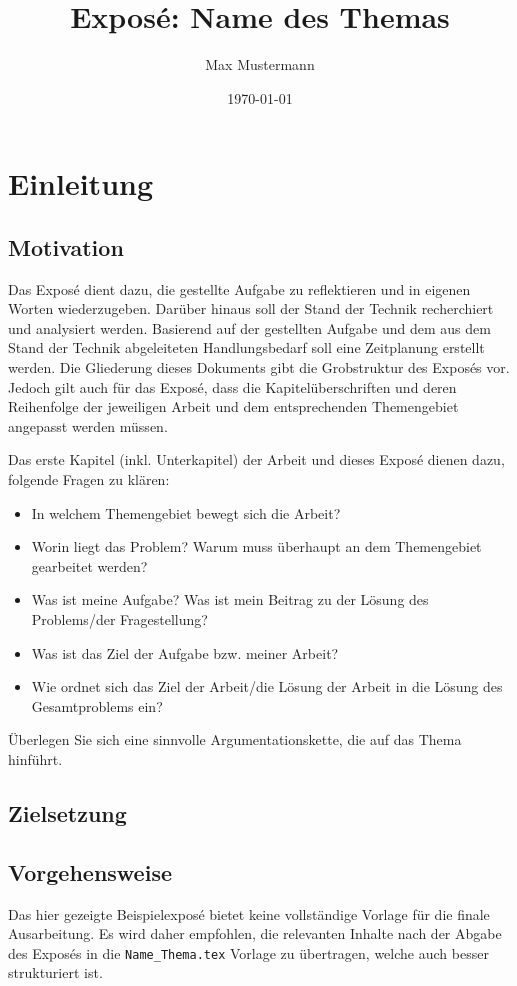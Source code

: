 \documentclass[ a4paper,
                toc=bibliography
              ]{scrartcl}
\author{Max Mustermann}
\title{Exposé: Name des Themas}
\date{\today}
\begin{document}
\maketitle
	
\section{Einleitung}
\subsection{Motivation}

Das Exposé dient dazu, die gestellte Aufgabe zu reflektieren und in eigenen Worten wiederzugeben. Darüber hinaus soll der Stand der Technik recherchiert und analysiert werden. Basierend auf der gestellten Aufgabe und dem aus dem Stand der Technik abgeleiteten Handlungsbedarf soll eine Zeitplanung erstellt werden. Die Gliederung dieses Dokuments gibt die Grobstruktur des Exposés vor. Jedoch gilt auch für das Exposé, dass die Kapitelüberschriften und deren Reihenfolge der jeweiligen Arbeit und dem entsprechenden Themengebiet angepasst werden müssen.

Das erste Kapitel (inkl. Unterkapitel) der Arbeit und dieses Exposé dienen dazu, folgende Fragen zu klären:

\begin{itemize}
    \item In welchem Themengebiet bewegt sich die Arbeit?
    \item Worin liegt das Problem? Warum muss überhaupt an dem Themengebiet gearbeitet werden?
    \item Was ist meine Aufgabe? Was ist mein Beitrag zu der Lösung des Problems/der Fragestellung?
    \item Was ist das Ziel der Aufgabe bzw. meiner Arbeit?
    \item Wie ordnet sich das Ziel der Arbeit/die Lösung der Arbeit in die Lösung des Gesamtproblems ein?
\end{itemize}

Überlegen Sie sich eine sinnvolle Argumentationskette, die auf das Thema hinführt.


\subsection{Zielsetzung}

\subsection{Vorgehensweise}
Das hier gezeigte Beispielexposé bietet keine vollständige Vorlage für die finale Ausarbeitung. Es wird daher empfohlen, die relevanten Inhalte nach der Abgabe des Exposés in die \texttt{Name\_Thema.tex} Vorlage zu übertragen, welche auch besser strukturiert ist.
\end{document}
